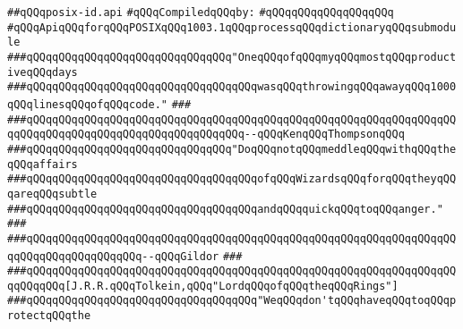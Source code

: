 \label{src/lib/std/src/psx/posix-id.api}
\verb|##qQQqposix-id.api|\newline
\newline
\verb|#qQQqCompiledqQQqby:|\newline
\verb|#qQQqqQQqqQQqqQQqqQQq|\newline
\newline
\newline
\newline
\verb|#qQQqApiqQQqforqQQqPOSIXqQQq1003.1qQQqprocessqQQqdictionaryqQQqsubmodule|\newline
\newline
\newline
\newline
\verb|###qQQqqQQqqQQqqQQqqQQqqQQqqQQqqQQq"OneqQQqofqQQqmyqQQqmostqQQqproductiveqQQqdays|\newline
\verb|###qQQqqQQqqQQqqQQqqQQqqQQqqQQqqQQqqQQqwasqQQqthrowingqQQqawayqQQq1000qQQqlinesqQQqofqQQqcode."|\newline
\verb|###|\newline
\verb|###qQQqqQQqqQQqqQQqqQQqqQQqqQQqqQQqqQQqqQQqqQQqqQQqqQQqqQQqqQQqqQQqqQQqqQQqqQQqqQQqqQQqqQQqqQQqqQQqqQQqqQQq--qQQqKenqQQqThompsonqQQq|\newline
\newline
\newline
\newline
\verb|###qQQqqQQqqQQqqQQqqQQqqQQqqQQqqQQq"DoqQQqnotqQQqmeddleqQQqwithqQQqtheqQQqaffairs|\newline
\verb|###qQQqqQQqqQQqqQQqqQQqqQQqqQQqqQQqqQQqofqQQqWizardsqQQqforqQQqtheyqQQqareqQQqsubtle|\newline
\verb|###qQQqqQQqqQQqqQQqqQQqqQQqqQQqqQQqqQQqandqQQqquickqQQqtoqQQqanger."|\newline
\verb|###|\newline
\verb|###qQQqqQQqqQQqqQQqqQQqqQQqqQQqqQQqqQQqqQQqqQQqqQQqqQQqqQQqqQQqqQQqqQQqqQQqqQQqqQQqqQQqqQQq--qQQqGildor|\newline
\verb|###|\newline
\verb|###qQQqqQQqqQQqqQQqqQQqqQQqqQQqqQQqqQQqqQQqqQQqqQQqqQQqqQQqqQQqqQQqqQQqqQQqqQQq[J.R.R.qQQqTolkein,qQQq"LordqQQqofqQQqtheqQQqRings"]|\newline
\newline
\newline
\newline
\verb|###qQQqqQQqqQQqqQQqqQQqqQQqqQQqqQQqqQQq"WeqQQqdon'tqQQqhaveqQQqtoqQQqprotectqQQqthe|\newline
